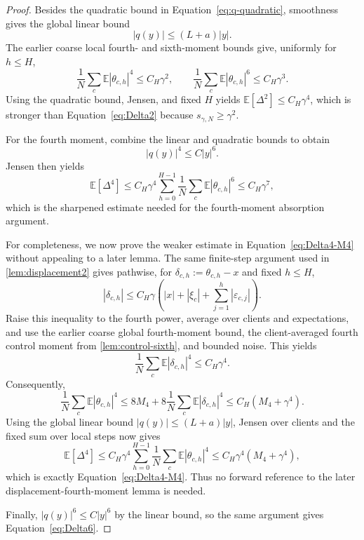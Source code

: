\documentclass[10pt,a4paper]{amsart}
\newcommand{\E}{\mathbb{E}}
\newcommand{\delt}{\delta}
\newcommand{\eps}{\varepsilon}
\newcommand{\smallscale}{s_{\gamma,N}}
\begin{document}
\begin{proof}
Besides the quadratic bound in Equation~\eqref{eq:q-quadratic}, smoothness gives the global linear bound
\[
  |q(y)|\le (L+a)|y|.
\]
The earlier coarse local fourth- and sixth-moment bounds give, uniformly for $h\le H$,
\[
  \frac1N\sum_c\E|\theta_{c,h}|^4\le C_H\gamma^2,
  \qquad
  \frac1N\sum_c\E|\theta_{c,h}|^6\le C_H\gamma^3.
\]
Using the quadratic bound, Jensen, and fixed $H$ yields $\E[\Delta^2]\le C_H\gamma^4$, which is stronger than Equation~\eqref{eq:Delta2} because $\smallscale\ge\gamma^2$.

For the fourth moment, combine the linear and quadratic bounds to obtain
\[
  |q(y)|^4\le C|y|^6.
\]
Jensen then yields
\[
  \E[\Delta^4]\le C_H\gamma^4
  \sum_{h=0}^{H-1}\frac1N\sum_c\E|\theta_{c,h}|^6
  \le C_H\gamma^7,
\]
which is the sharpened estimate needed for the fourth-moment absorption argument.

For completeness, we now prove the weaker estimate in Equation~\eqref{eq:Delta4-M4} without appealing to a later lemma. The same finite-step argument used in \cref{lem:displacement2} gives pathwise, for $\delt_{c,h}:=\theta_{c,h}-x$ and fixed $h\le H$,
\[
  |\delt_{c,h}|
  \le C_H\gamma\left(|x|+|\xi_c|+\sum_{j=1}^h|\eps_{c,j}|\right).
\]
Raise this inequality to the fourth power, average over clients and expectations, and use the earlier coarse global fourth-moment bound, the client-averaged fourth control moment from \cref{lem:control-sixth}, and bounded noise. This yields
\[
  \frac1N\sum_c\E|\delt_{c,h}|^4\le C_H\gamma^4.
\]
Consequently,
\[
  \frac1N\sum_c\E|\theta_{c,h}|^4
  \le 8M_4+8\frac1N\sum_c\E|\delt_{c,h}|^4
  \le C_H(M_4+\gamma^4).
\]
Using the global linear bound $|q(y)|\le (L+a)|y|$, Jensen over clients and the fixed sum over local steps now gives
\[
  \E[\Delta^4]
  \le C_H\gamma^4\sum_{h=0}^{H-1}\frac1N\sum_c\E|\theta_{c,h}|^4
  \le C_H\gamma^4(M_4+\gamma^4),
\]
which is exactly Equation~\eqref{eq:Delta4-M4}. Thus no forward reference to the later displacement-fourth-moment lemma is needed.

Finally, $|q(y)|^6\le C|y|^6$ by the linear bound, so the same argument gives Equation~\eqref{eq:Delta6}.
\end{proof}
\end{document}
